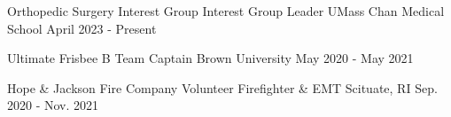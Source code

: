 
\begin{cventries}

\vspace{-1mm}
\cventry
  {Orthopedic Surgery Interest Group} %
  {Interest Group Leader} %
  {UMass Chan Medical School} %
  {April 2023 - Present} %
  {}

  \cventry
    {Ultimate Frisbee B Team} %
    {Captain} %
    {Brown University} %
    {May 2020 - May 2021} %
    {}

  \cventry
    {Hope \& Jackson Fire Company} %
    {Volunteer Firefighter \& EMT} %
    {Scituate, RI} %
    {Sep. 2020 - Nov. 2021} %
    {}

\end{cventries}
